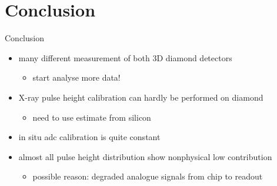 \section{Conclusion}
\begin{frame}{Conclusion}

	\begin{minipage}[c][4cm]{\textwidth}
		\begin{itemize}
			\itemfill
			\item many different measurement of both 3D diamond detectors
			\begin{itemize}
				\item start analyse more data!\vspace*{2ex}
			\end{itemize}
			\item X-ray pulse height calibration can hardly be performed on diamond
			\begin{itemize}
				\item need to use estimate from silicon\vspace*{2ex}
			\end{itemize}
			\item in situ adc calibration is quite constant
			\item almost all pulse height distribution show nonphysical low contribution
			\begin{itemize}
				\item possible reason: degraded analogue signals from chip to readout\vspace*{2ex}
			\end{itemize}

		\end{itemize}
	\end{minipage}
	
\end{frame}

